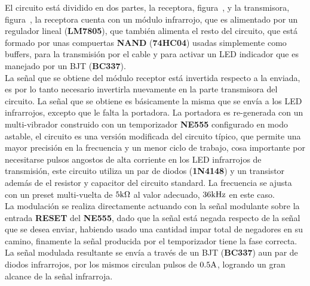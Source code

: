
El circuito está dividido en dos partes, la receptora, figura~, y la transmisora, figura~, la receptora cuenta con un módulo infrarrojo, que es alimentado por un regulador lineal (\textbf{LM7805}), que también alimenta el resto del circuito, que está formado por unas compuertas \textbf{NAND} (\textbf{74HC04}) usadas simplemente como buffers, para la transmisión por el cable y para activar un LED indicador que es manejado por un BJT (\textbf{BC337}).\\

La señal que se obtiene del módulo receptor está invertida respecto a la enviada, es por lo tanto necesario invertirla nuevamente en la parte transmisora del circuito. La señal que se obtiene es básicamente la misma que se envía a los LED infrarrojos, excepto que le falta la portadora. La portadora es re-generada con un multi-vibrador construido con un temporizador \textbf{NE555} configurado en modo astable, el circuito es una versión modificada del circuito típico, que permite una mayor precisión en la frecuencia y un menor ciclo de trabajo, cosa importante por necesitarse pulsos angostos de alta corriente en los LED infrarrojos de transmisión, este circuito utiliza un par de diodos (\textbf{1N4148}) y un transistor además de el resistor y capacitor del circuito standard. La frecuencia se ajusta con un preset multi-vuelta de  $5 \si[per-mode=symbol]{\kilo\ohm}$ al valor adecuado,  $36 \si[per-mode=symbol]{\kilo\hertz}$ en este caso. \\

La modulación se realiza directamente actuando con la señal modulante sobre la entrada \textbf{RESET} del \textbf{NE555}, dado que la señal está negada respecto de la señal que se desea enviar, habiendo usado una cantidad impar total de negadores en su camino, finamente la señal producida por el temporizador tiene la fase correcta. La señal modulada resultante se envía a través de un BJT (\textbf{BC337}) aun par de diodos infrarrojos, por los mismos circulan pulsos de $0.5 \si[per-mode=symbol]{\ampere}$, logrando un gran alcance de la señal infrarroja.


\clearpage

